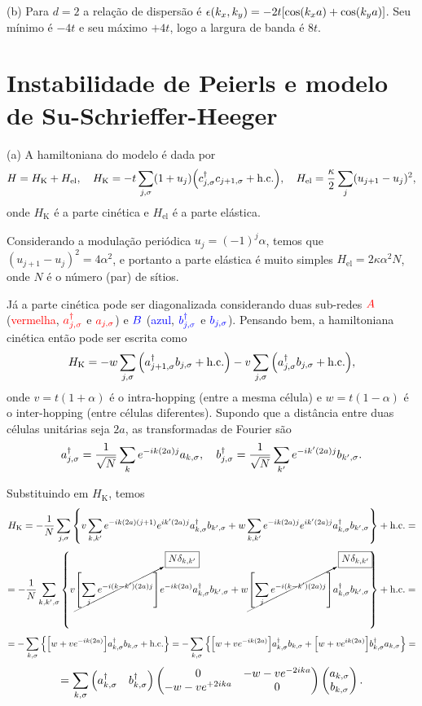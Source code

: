 \documentclass[a4paper,10pt]{article}
\begin{document}
(b) Para $d = 2$ a relação de dispersão é $\epsilon(k_x, k_y) = -2t [\cos(k_x a) + \cos(k_y a)]$. Seu mínimo é $-4t$ e seu máximo $+4t$, logo a largura de banda é $8t$.


\pagebreak

\section{Instabilidade de Peierls e modelo de Su-Schrieffer-Heeger}

(a) A hamiltoniana do modelo é dada por
$$
H = H_{\text{K}} + H_{\text{el}},
\quad
H_{\text{K}} = -t \sum_{j,\sigma} (1 + u_j) \qty(c_{j,\sigma}^\dagger c_{j+1, \sigma} + \text{h.c.}),
\quad
H_{\text{el}} = \frac{\kappa}{2} \sum_{j} (u_{j+1} - u_j)^2,
$$
onde $H_{\text{K}}$ é a parte cinética e $H_{\text{el}}$ é a parte elástica.

Considerando a modulação periódica $u_j = (-1)^j \alpha$, temos que $(u_{j+1} - u_j)^2 = 4 \alpha^2$, e portanto a parte elástica é muito simples $H_{\text{el}} = 2 \kappa \alpha^2 N$, onde $N$ é o número (par) de sítios.

Já a parte cinética pode ser diagonalizada considerando duas sub-redes $\textcolor{red}{A}$ (\textcolor{red}{vermelha}, $\textcolor{red}{a_{j,\sigma}^\dagger}$ e $\textcolor{red}{a_{j,\sigma}}$) e $\textcolor{blue}{B}$ (\textcolor{blue}{azul}, $\textcolor{blue}{b_{j,\sigma}^\dagger}$ e $\textcolor{blue}{b_{j,\sigma}}$). Pensando bem, a hamiltoniana cinética então pode ser escrita como
$$
H_{\text{K}} = -w \sum_{j, \sigma} \qty(a_{j+1,\sigma}^\dagger b_{j,\sigma} + \text{h.c.})
-v \sum_{j,\sigma} \qty(a_{j,\sigma}^\dagger b_{j,\sigma} + \text{h.c.}),
$$
onde $v = t(1+\alpha)$ é o intra-hopping (entre a mesma célula) e $w = t(1-\alpha)$ é o inter-hopping (entre células diferentes). Supondo que a distância entre duas células unitárias seja $2a$, as transformadas de Fourier são
$$
a_{j,\sigma}^\dagger = \frac{1}{\sqrt{N}} \sum_{k} e^{-ik (2a) j} a_{k,\sigma}, \quad
b_{j,\sigma}^\dagger = \frac{1}{\sqrt{N}} \sum_{k'} e^{-ik' (2a) j} b_{k',\sigma}.
$$

Substituindo em $H_{\text{K}}$, temos
$$
H_{\text{K}} = - \frac{1}{N}
\sum_{j,\sigma} \qty{ v
\sum_{k,k'} e^{-ik(2a)(j+1)} e^{ik'(2a)j} a_{k,\sigma}^\dagger b_{k',\sigma}
+ w
\sum_{k,k'} e^{-ik(2a)j} e^{ik'(2a)j} a_{k,\sigma}^\dagger b_{k',\sigma}} + \text{h.c.} =
$$
$$
= - \frac{1}{N}
\sum_{k, k', \sigma} \qty{ v
\cancelto{\boxed{N \delta_{k,k'}}}{\qty[\sum_{j} e^{-i(k-k')(2a)j}]}
e^{-ik(2a)} a_{k,\sigma}^\dagger b_{k',\sigma}
+ w
\cancelto{\boxed{N \delta_{k,k'}}}{\qty[\sum_{j} e^{-i(k-k')(2a)j}]}
a_{k,\sigma}^\dagger b_{k',\sigma}} + \text{h.c.} =
$$
$$
= - \sum_{k, \sigma} \qty{ \qty[ w  + v
e^{-ik(2a)}]
a_{k,\sigma}^\dagger b_{k,\sigma} + \text{h.c.} } =
- \sum_{k, \sigma} \qty{ \qty[ w  + v
e^{-ik(2a)}]
a_{k,\sigma}^\dagger b_{k,\sigma} +
\qty[ w  + v
e^{ik(2a)}]
b_{k,\sigma}^\dagger a_{k,\sigma}
} =
$$
$$
= \sum_{k, \sigma}
\begin{pmatrix}
a_{k,\sigma}^\dagger & b_{k,\sigma}^\dagger
\end{pmatrix}
\begin{pmatrix}
0 & -w - v e^{-2ika} \\
-w - v e^{+2ika} & 0
\end{pmatrix}
\begin{pmatrix}
a_{k,\sigma} \\ b_{k,\sigma}
\end{pmatrix}.
$$
\end{document}
